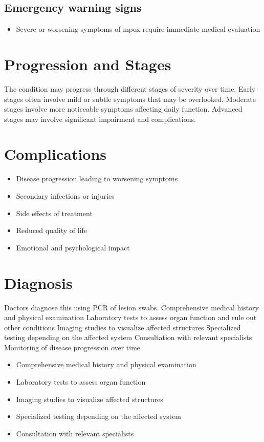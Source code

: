 \subsection{Emergency warning signs}
\begin{itemize}[noitemsep]
  \item Severe or worsening symptoms of mpox require immediate medical evaluation
\end{itemize}
\section{Progression and Stages}
The condition may progress through different stages of severity over time. Early stages often involve mild or subtle symptoms that may be overlooked. Moderate stages involve more noticeable symptoms affecting daily function. Advanced stages may involve significant impairment and complications.
\section{Complications}
\begin{itemize}[noitemsep]
  \item Disease progression leading to worsening symptoms
  \item Secondary infections or injuries
  \item Side effects of treatment
  \item Reduced quality of life
  \item Emotional and psychological impact
\end{itemize}
\section{Diagnosis}
Doctors diagnose this using PCR of lesion swabs. Comprehensive medical history and physical examination Laboratory tests to assess organ function and rule out other conditions Imaging studies to visualize affected structures Specialized testing depending on the affected system Consultation with relevant specialists Monitoring of disease progression over time

\begin{itemize}[noitemsep]
  \item Comprehensive medical history and physical examination
  \item Laboratory tests to assess organ function
  \item Imaging studies to visualize affected structures
  \item Specialized testing depending on the affected system
  \item Consultation with relevant specialists
\end{itemize}
